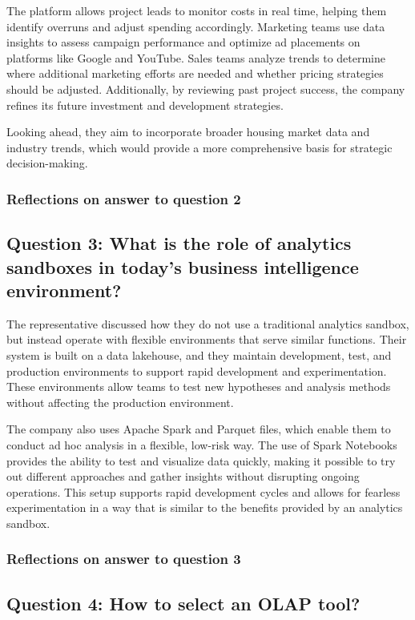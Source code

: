 The platform allows project leads to monitor costs in real time, helping them identify overruns and adjust spending accordingly. 
Marketing teams use data insights to assess campaign performance and optimize ad placements on platforms like Google and YouTube. 
Sales teams analyze trends to determine where additional marketing efforts are needed and whether pricing strategies should be adjusted. 
Additionally, by reviewing past project success, the company refines its future investment and development strategies.

Looking ahead, they aim to incorporate broader housing market data and industry trends, which would provide a more comprehensive basis 
for strategic decision-making.
\subsubsection{Reflections on answer to question 2}
\subsection{Question 3: What is the role of analytics sandboxes in today's business intelligence environment?} 

The representative discussed how they do not use a traditional analytics sandbox, but instead operate with flexible environments that 
serve similar functions. Their system is built on a data lakehouse, and they maintain development, test, and production environments 
to support rapid development and experimentation. These environments allow teams to test new hypotheses and analysis methods without 
affecting the production environment.

The company also uses Apache Spark and Parquet files, which enable them to conduct ad hoc analysis in a flexible, low-risk way. The 
use of Spark Notebooks provides the ability to test and visualize data quickly, making it possible to try out different approaches and 
gather insights without disrupting ongoing operations. This setup supports rapid development cycles and allows for fearless experimentation 
in a way that is similar to the benefits provided by an analytics sandbox.
\subsubsection{Reflections on answer to question 3}
\subsection{Question 4: How to select an OLAP tool?}

